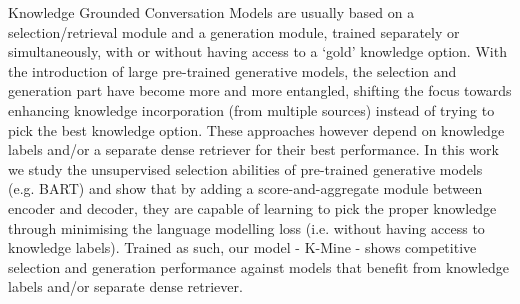 Knowledge Grounded Conversation Models are usually based on a selection/retrieval module and a generation module, trained separately or simultaneously, with or without having access to a `gold' knowledge option. With the introduction of large pre-trained generative models, the selection and generation part have become more and more entangled, shifting the focus towards enhancing knowledge incorporation (from multiple sources) instead of trying to pick the best knowledge option. These approaches however depend on knowledge labels and/or a separate dense retriever for their best performance. In this work we study the unsupervised selection abilities of pre-trained generative models (e.g. BART) and show that by adding a score-and-aggregate module between encoder and decoder, they are capable of learning to pick the proper knowledge through minimising the language modelling loss (i.e. without having access to knowledge labels). Trained as such,  our model -  K-Mine - shows competitive selection and generation performance against models that benefit from knowledge labels and/or separate dense retriever.
